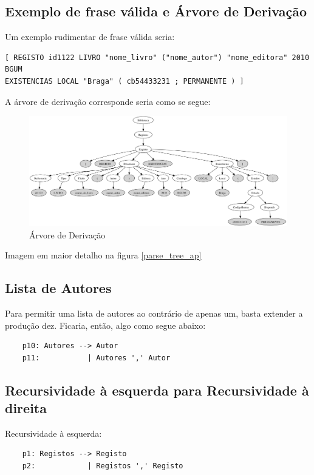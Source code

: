 \documentclass[a4paper,11pt,openright,openbib]{article}
\begin{document}
\subsection{Exemplo de frase válida e Árvore de Derivação}

Um exemplo rudimentar de frase válida seria: 
\begin{verbatim}
[ REGISTO id1122 LIVRO "nome_livro" ("nome_autor") "nome_editora" 2010 BGUM 
EXISTENCIAS LOCAL "Braga" ( cb54433231 ; PERMANENTE ) ]
\end{verbatim}

A árvore de derivação corresponde seria como se segue:

\begin{figure}[!htb]
	\begin{center}
		\includegraphics[width=\textwidth,keepaspectratio]{../ficha5/g.png}
	\end{center}	
	\caption{\label{parse_tree}Árvore de Derivação}
\end{figure}

\small{Imagem em maior detalho na figura \ref{parse_tree_ap}}

\subsection{Lista de Autores}
Para permitir uma lista de autores ao contrário de apenas um, basta extender a produção dez.
Ficaria, então, algo como segue abaixo:

\begin{verbatim}
	p10: Autores --> Autor
	p11:           | Autores ',' Autor
\end{verbatim}

\subsection{Recursividade à esquerda para Recursividade à direita}

Recursividade à esquerda:
\begin{verbatim}
	p1: Registos --> Registo
	p2:            | Registos ',' Registo
\end{verbatim}
\end{document}
